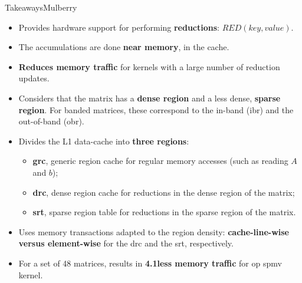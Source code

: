 \begin{highlight}{Takeaways}{Mulberry}
    \raggedright
    \begin{itemize}
        \item Provides hardware support for performing \textbf{\glspl{reduction}}: $\mathit{RED}(key, value)$.
        \item The accumulations are done \textbf{near memory}, in the cache.
        \item \textbf{Reduces memory traffic} for kernels with a large number of \gls{reduction} updates.
    \end{itemize}

    \bigskip
    \begin{itemize}
        \item Considers that the matrix has a \textbf{dense region} and a less dense, \textbf{sparse region}. For \gls{banded} matrices, these correspond to the in-\gls{band} (\acrshort{ibr}) and the out-of-\gls{band} (\acrshort{obr}).
        \item Divides the L1 data-cache into \textbf{three regions}:
        \begin{itemize}
            \item \textbf{\acrshort{grc}}, generic region cache for regular memory accesses (such as reading $A$ and $b$);
            \item \textbf{\acrshort{drc}}, dense region cache for \glspl{reduction} in the dense region of the matrix;
            \item \textbf{\acrshort{srt}}, sparse region table for \glspl{reduction} in the sparse region of the matrix.
        \end{itemize}
        \item Uses memory transactions adapted to the region density: \textbf{cache-line-wise versus element-wise} for the \acrshort{drc} and the \acrshort{srt}, respectively.
        \item For a set of 48 matrices, results in \textbf{4.1\tms less memory traffic} for \acrshort{op} \acrshort{spmv} kernel.
    \end{itemize}
\end{highlight}

\clearpage